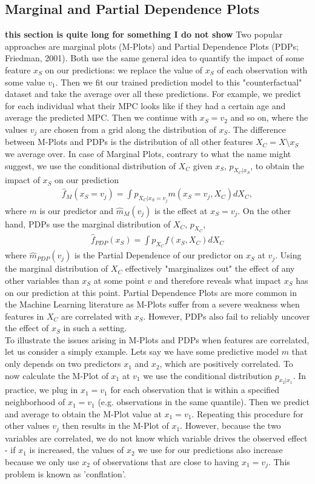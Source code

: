 \subsection{Marginal and Partial Dependence Plots}
\textbf{this section is quite long for something I do not show}
Two popular approaches are marginal plots (M-Plots) and Partial Dependence Plots (PDPs; Friedman, 2001). Both use the same general idea to quantify the impact of some feature $x_S$ on our predictions: we replace the value of $x_S$ of each observation with some value $v_1$. Then we fit our trained prediction model to this "counterfactual" dataset and take the average over all these predictions. For example, we predict for each individual what their MPC looks like if they had a certain age and average the predicted MPC. Then we continue with $x_S=v_2$ and so on, where the values $v_j$ are chosen from a grid along the distribution of $x_S$. The difference between M-Plots and PDPs is the distribution of all other features $X_C=X\setminus x_S$ we average over. In case of Marginal Plots, contrary to what the name might suggest, we use the conditional distribution of $X_C$ given $x_S$, $p_{X_C|x_S}$, to obtain the impact of $x_S$ on our prediction
\begin{align}
\hat{f}_M(x_S=v_j)=\int p_{X_C|x_S=v_j} m(x_S=v_j, X_C)dX_C, 
\end{align}
where $m$ is our predictor and $\hat{m}_M(v_j)$ is the effect at $x_S=v_j$. On the other hand, PDPs use the marginal distribution of $X_C$, $p_{X_C}$, 
\begin{align}
    \hat{f}_{PDP}(x_S)=\int p_{X_C} f(x_S, X_C)dX_C \label{eq:pdp}
\end{align}
where $\hat{m}_{PDP}(v_j)$ is the Partial Dependence of our predictor on $x_S$ at $v_j$. Using the marginal distribution of $X_C$ effectively "marginalizes out" the effect of any other variables than $x_S$ at some point $v$ and therefore reveals what impact $x_S$ has on our prediction at this point. Partial Dependence Plots are more common in the Machine Learning literature as M-Plots suffer from a severe weakness when features in $X_C$ are correlated with $x_S$. However, PDPs also fail to reliably uncover the effect of $x_S$ in such a setting. \\
To illustrate the issues arising in M-Plots and PDPs when features are correlated, let us consider a simply example. Lets say we have some predictive model $m$ that only depends on two predictors $x_1$ and $x_2$, which are positively correlated. To now calculate the M-Plot of $x_1$ at $v_1$ we use the conditional distribution $p_{x_2|x_1}$. In practice, we plug in $x_1=v_1$ for each observation that is within a specified neighborhood of $x_1=v_1$ (e.g. observations in the same quantile). Then we predict and average to obtain the M-Plot value at $x_1=v_1$. Repeating this procedure for other values $v_j$ then results in the M-Plot of $x_1$. However, because the two variables are correlated, we do not know which variable drives the observed effect - if $x_1$  is increased, the values of $x_2$  we use for our predictions also increase because we only use $x_2$ of observations that are close to having $x_1=v_j$. This problem is known as 'conflation'. \\

